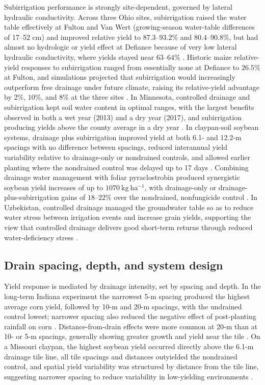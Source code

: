 \documentclass[11pt]{article}
\begin{document}
Subirrigation performance is strongly site-dependent, governed by lateral hydraulic conductivity. Across three Ohio sites, subirrigation raised the water table effectively at Fulton and Van Wert (growing-season water-table differences of 17--52 cm) and improved relative yield to \(87.3\textrm{--}93.2\%\) and \(80.4\textrm{--}90.8\%\), but had almost no hydrologic or yield effect at Defiance because of very low lateral hydraulic conductivity, where yields stayed near \(63\textrm{--}64\%\) \parencite{Gunn2018,Gunn2019}. Historic maize relative-yield responses to subirrigation ranged from essentially none at Defiance to \(26.5\%\) at Fulton, and simulations projected that subirrigation would increasingly outperform free drainage under future climate, raising its relative-yield advantage by \(2\%\), \(10\%\), and \(8\%\) at the three sites \parencite{Gunn2018}. In Minnesota, controlled drainage and subirrigation kept soil water content in optimal ranges, with the largest benefits observed in both a wet year (2013) and a dry year (2017), and subirrigation producing yields above the county average in a dry year \parencite{Niaghi2019}. In claypan-soil soybean systems, drainage plus subirrigation improved yield at both 6.1- and 12.2-m spacings with no difference between spacings, reduced interannual yield variability relative to drainage-only or nondrained controls, and allowed earlier planting where the nondrained control was delayed up to 17 days \parencite{Nelson2011}. Combining drainage water management with foliar pyraclostrobin produced synergistic soybean yield increases of up to \(1070\ \mathrm{kg\ ha^{-1}}\), with drainage-only or drainage-plus-subirrigation gains of \(18\textrm{--}22\%\) over the nondrained, nonfungicide control \parencite{Nelson2011b}. In Uzbekistan, controlled drainage managed the groundwater table so as to reduce water stress between irrigation events and increase grain yields, supporting the view that controlled drainage delivers good short-term returns through reduced water-deficiency stress \parencite{Dukhovny2018}.

\subsection{Drain spacing, depth, and system design}

Yield response is mediated by drainage intensity, set by spacing and depth. In the long-term Indiana experiment the narrowest 5-m spacing produced the highest average corn yield, followed by 10-m and 20-m spacings, with the undrained control lowest; narrower spacing also reduced the negative effect of post-planting rainfall on corn \parencite{Rui2024}. Distance-from-drain effects were more common at 20-m than at 10- or 5-m spacings, generally showing greater growth and yield near the tile \parencite{Kladivko2005}. On a Missouri claypan, the highest soybean yield occurred directly above the 6.1-m drainage tile line, all tile spacings and distances outyielded the nondrained control, and spatial yield variability was structured by distance from the tile line, suggesting narrower spacing to reduce variability in low-yielding environments \parencite{Nelson2017}.
\end{document}
